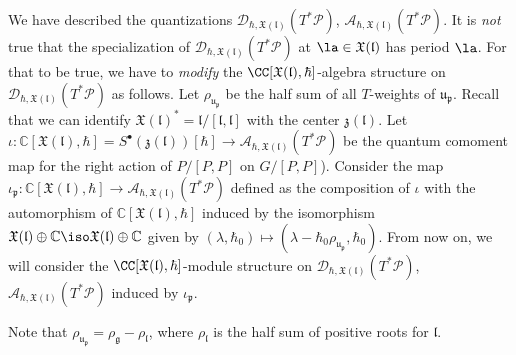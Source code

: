 \documentclass[12pt]{amsart}
\begin{document}
We have described the quantizations $\mathcal{D}_{\hbar,\mathfrak{X}(\mathfrak{l})}(T^*\mathcal{P})$,  $\mathcal{A}_{\hbar,\mathfrak{X}(\mathfrak{l})}(T^*\mathcal{P})$. It is {\emph{not}} true that the specialization of $\mathcal{D}_{\hbar,\mathfrak{X}(\mathfrak{l})}(T^*\mathcal{P})$ at $\la \in \mathfrak{X}(\mathfrak{l})$ has period $\la$. For that to be true, we have to {\em{modify}} the $\CC[\mathfrak{X}(\mathfrak{l}),\hbar]$-algebra structure on $\mathcal{D}_{\hbar,\mathfrak{X}(\mathfrak{l})}(T^*\mathcal{P})$ as follows.
Let $\rho_{\mathfrak{u}_{\mathfrak{p}}}$ be the half sum of all $T$-weights of $\mathfrak{u}_{\mathfrak{p}}$. Recall that we can identify $\mathfrak{X}(\mathfrak{l})^*=\mathfrak{l}/[\mathfrak{l},\mathfrak{l}]$ with the center $\mathfrak{z}(\mathfrak{l})$.
Let $\iota\colon \mathbb{C}[\mathfrak{X}(\mathfrak{l}),\hbar]=S^{\bullet}(\mathfrak{z}(\mathfrak{l}))[\hbar] \rightarrow \mathcal{A}_{\hbar,\mathfrak{X}(\mathfrak{l})}(T^*\mathcal{P})$ be the quantum comoment map for the right action of $P/[P,P]$ on $G/[P,P]$).
Consider the map $\iota_{\mathfrak{p}} \colon \mathbb{C}[\mathfrak{X}(\mathfrak{l}),\hbar] \rightarrow \mathcal{A}_{\hbar,\mathfrak{X}(\mathfrak{l})}(T^*\mathcal{P})$ defined as the composition of  $\iota$ with the automorphism of $\mathbb{C}[\mathfrak{X}(\mathfrak{l}),\hbar]$ induced by the isomorphism $\mathfrak{X}(\mathfrak{l}) \oplus \mathbb{C} \iso \mathfrak{X}(\mathfrak{l}) \oplus \mathbb{C}$ given by $(\lambda,\hbar_0) \mapsto (\lambda-\hbar_0\rho_{\mathfrak{u}_{\mathfrak{p}}},\hbar_0)$.
From now on, we will consider the $\CC[\mathfrak{X}(\mathfrak{l}),\hbar]$-module structure on $\mathcal{D}_{\hbar,\mathfrak{X}(\mathfrak{l})}(T^*\mathcal{P})$, $\mathcal{A}_{\hbar,\mathfrak{X}(\mathfrak{l})}(T^*\mathcal{P})$ induced by $\iota_{\mathfrak{p}}$. 


\begin{rmk}
Note that $\rho_{\mathfrak{u}_{\mathfrak{p}}}=\rho_{\mathfrak{g}}-\rho_{{\mathfrak{l}}}$, where $\rho_{\mathfrak{l}}$ is the half sum of positive roots for $\mathfrak{l}$.
\end{rmk}
\end{document}
